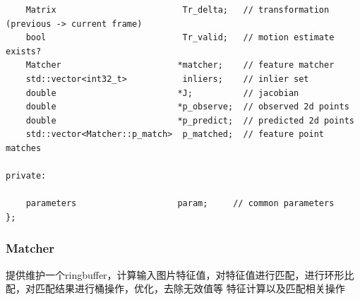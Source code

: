 \documentclass[UTF8]{ctexart}
\begin{document}
\begin{verbatim}
    Matrix                         Tr_delta;   // transformation (previous -> current frame)  
    bool                           Tr_valid;   // motion estimate exists?
    Matcher                       *matcher;    // feature matcher
    std::vector<int32_t>           inliers;    // inlier set
    double                        *J;          // jacobian
    double                        *p_observe;  // observed 2d points
    double                        *p_predict;  // predicted 2d points
    std::vector<Matcher::p_match>  p_matched;  // feature point matches
  
private:
  
    parameters                    param;     // common parameters
};
    \end{verbatim}
    \subsubsection{Matcher}
    提供维护一个ringbuffer，计算输入图片特征值，对特征值进行匹配，进行环形比配，对匹配结果进行桶操作，优化，去除无效值等
    特征计算以及匹配相关操作
\end{document}
